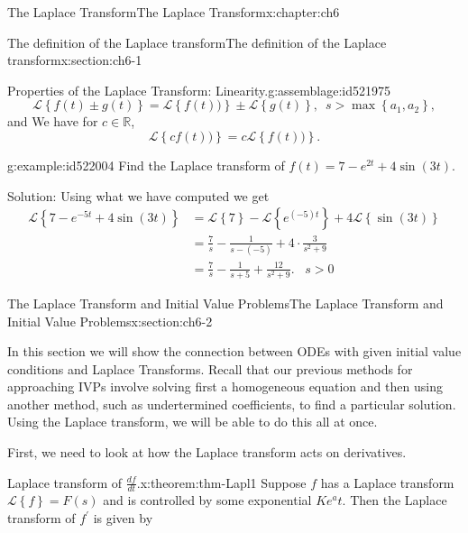 \documentclass[oneside,10pt,]{book}
\numberwithin{equation}{section}
\numberwithin{equation}{section}
\newcommand{\amp}{&}
\begin{document}
\begin{chapterptx}{The Laplace Transform}{}{The Laplace Transform}{}{}{x:chapter:ch6}
\begin{sectionptx}{The definition of the Laplace transform}{}{The definition of the Laplace transform}{}{}{x:section:ch6-1}
\begin{assemblage}{Properties of the Laplace Transform: Linearity.}{g:assemblage:id521975}
\begin{equation*}
\mathcal{L}\left\{ f(t)\pm g(t)\right\} =\mathcal{L}\left\{ f(t))\right\} \pm\mathcal{L}\left\{ g(t)\right\} ,\,\,\,s>\max\left\{ a_{1},a_{2}\right\} ,
\end{equation*}
and We have for \(c\in\mathbb{R}\),%
\begin{equation*}
\mathcal{L}\left\{ cf(t))\right\} =c\mathcal{L}\left\{ f(t))\right\} .
\end{equation*}
%
\end{assemblage}
\begin{example}{}{g:example:id522004}%
Find the Laplace transform of \(f(t)=7-e^{2t}+4\sin(3t)\).%
\par
Solution: Using what we have computed we get%
\begin{align*}
\mathcal{L}\left\{ 7-e^{-5t}+4\sin(3t)\right\}  \amp =\mathcal{L}\left\{ 7\right\} -\mathcal{L}\left\{ e^{(-5)t}\right\} +4\mathcal{L}\left\{ \sin(3t)\right\} \\
\amp =\frac{7}{s}-\frac{1}{s-(-5)}+4\cdot\frac{3}{s^{2}+9}\\
\amp =\frac{7}{s}-\frac{1}{s+5}+\frac{12}{s^{2}+9}.\,\,\,\,\,s>0
\end{align*}
%
\end{example}
\end{sectionptx}
%
%
\typeout{************************************************}
\typeout{************************************************}
%
\begin{sectionptx}{The Laplace Transform and Initial Value Problems}{}{The Laplace Transform and Initial Value Problems}{}{}{x:section:ch6-2}
\begin{introduction}{}%
In this section we will show the connection between ODEs with given initial value conditions and Laplace Transforms. Recall that our previous methods for approaching IVPs involve solving first a homogeneous equation and then using another method, such as undertermined coefficients, to find a particular solution. Using the Laplace transform, we will be able to do this all at once.%
\par
First, we need to look at how the Laplace transform acts on derivatives.%
\begin{theorem}{Laplace transform of \(\frac{df}{dt}\).}{}{x:theorem:thm-Lapl1}%
Suppose \(f\) has a Laplace transform \(\mathcal{L}\left\{ f\right\} = F(s) \) and is controlled by some exponential \(Ke^at\). Then the Laplace transform of \(f^{\prime}\) is given by%

\end{theorem}
\end{introduction}
\end{sectionptx}
\end{chapterptx}
\end{document}
